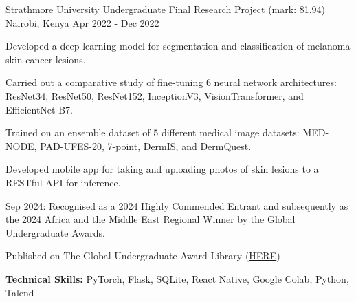 \begin{cventries}
    \cventry
        {Strathmore University} %
        {Undergraduate Final Research Project (mark: 81.94)} %
        {Nairobi, Kenya} %
        {Apr 2022 - Dec 2022} %
        {
          \begin{cvitems} %
            \item {Developed a deep learning model for segmentation and classification of melanoma skin cancer lesions.}
            \item {Carried out a comparative study of fine-tuning 6 neural network architectures: ResNet34, ResNet50, ResNet152, InceptionV3, VisionTransformer, and EfficientNet-B7.}
            \item {Trained on an ensemble dataset of 5 different medical image datasets: MED-NODE, PAD-UFES-20, 7-point, DermIS, and DermQuest.}
            \item {Developed mobile app for taking and uploading photos of skin lesions to a RESTful API for inference.}
            \item Sep 2024: Recognised as a 2024 Highly Commended Entrant and subsequently as the 2024 Africa and the Middle East Regional Winner by the Global Undergraduate Awards.
            \item Published on The Global Undergraduate Award Library (\href{https://gua.soutron.net/Portal/Default/en-GB/RecordView/Index/3205}{HERE})
            \item {\textbf{Technical Skills:} PyTorch, Flask, SQLite, React Native, Google Colab, Python, Talend}
          \end{cvitems}
        }
\end{cventries}
